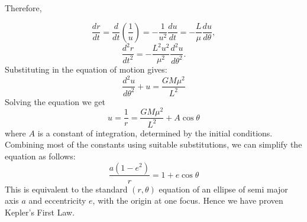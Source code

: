 \documentclass{article}
\begin{document}
\begin{tcolorbox}[breakable,colback=red!5!white, colframe=red!75!black, title={Derivation of 1st Law}]
Therefore,

\[
\frac{dr}{dt} = \frac{d}{dt}\left(\frac{1}{u}\right) = -\frac{1}{u^2} \frac{du}{dt} 
= -\frac{L}{\mu} \frac{du}{d\theta},
\]
\[
\frac{d^2 r}{dt^2} = -\frac{L^2 u^2}{\mu^2} \frac{d^2 u}{d\theta^2}.
\]
Substituting in the equation of motion gives:
$$
\frac{d^2u}{d\theta^2} + u = \frac{GM\mu^2}{L^2}
$$
Solving the equation we get
$$
u = \frac{1}{r} = \frac{GM\mu^2}{L^2} + A\cos\theta
$$
where $A$ is a constant of integration, determined by the initial conditions. 
\newpage
Combining most of the constants using suitable substitutions, we can simplify the equation as follows:
$$
\frac{a(1-e^2)}{r} = 1 + e\cos\theta
$$
This is equivalent to the standard $(r, \theta)$ equation of an ellipse of semi major axis $a$ and eccentricity $e$, with the origin at one focus. 
Hence we have proven Kepler's First Law. 
\end{tcolorbox}
\end{document}
